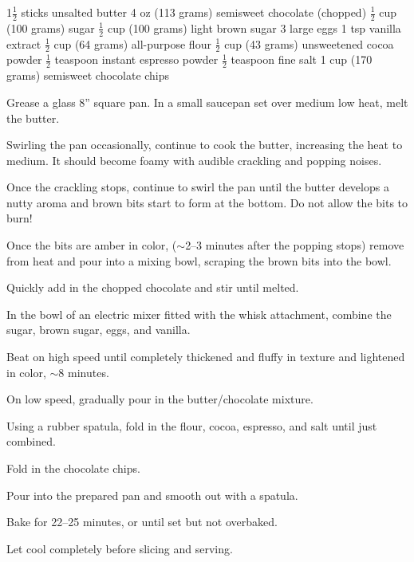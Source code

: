 \dishtype{\dessert}
\dishother{\vegetarian}
\begin{ingreds}
    1$\frac{1}{2}$ sticks unsalted butter
    4 oz (113 grams) semisweet chocolate (chopped)
    $\frac{1}{2}$ cup (100 grams) sugar
    $\frac{1}{2}$ cup (100 grams) light brown sugar
    3 large eggs
    1 tsp vanilla extract
    $\frac{1}{2}$ cup (64 grams) all-purpose flour
    $\frac{1}{2}$ cup (43 grams) unsweetened cocoa powder
    $\frac{1}{2}$ teaspoon instant espresso powder
    $\frac{1}{2}$ teaspoon fine salt
    1 cup (170 grams) semisweet chocolate chips
\end{ingreds}
\begin{method}
    Grease a glass 8'' square pan.
    In a small saucepan set over medium low heat, melt the butter.\par
    Swirling the pan occasionally, continue to cook the butter, increasing the heat to medium. It should become foamy with audible crackling and popping noises.\par
    Once the crackling stops, continue to swirl the pan until the butter develops a nutty aroma and brown bits start to form at the bottom. Do not allow the bits to burn!\par
    Once the bits are amber in color, ($\sim$2--3 minutes after the popping stops) remove from heat and pour into a mixing bowl, scraping the brown bits into the bowl.\par
    Quickly add in the chopped chocolate and stir until melted.\par
    In the bowl of an electric mixer fitted with the whisk attachment, combine the sugar, brown sugar, eggs, and vanilla.\par
    Beat on high speed until completely thickened and fluffy in texture and lightened in color, $\sim$8 minutes.\par
    On low speed, gradually pour in the butter/chocolate mixture.\par
    Using a rubber spatula, fold in the flour, cocoa, espresso, and salt until just combined.\par
    Fold in the chocolate chips.\par
    Pour into the prepared pan and smooth out with a spatula.\par
    Bake for 22--25 minutes, or until set but not overbaked.\par
    Let cool completely before slicing and serving.       
\end{method}